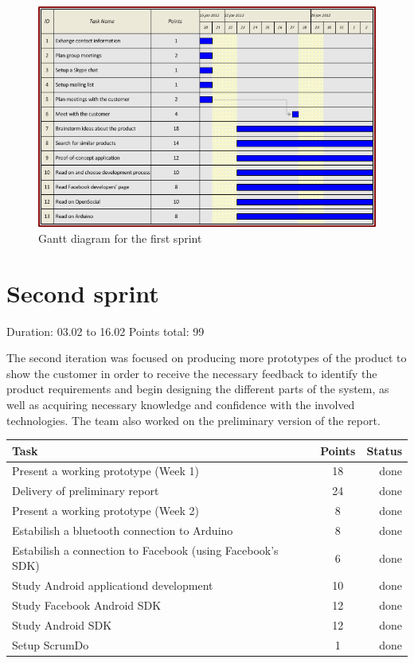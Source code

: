 \begin{figure}[h!]
\centering \includegraphics[scale=0.8]{img/sprints-gantt1.png}
\caption{Gantt diagram for the first sprint}
\label{fig:sprints-gantt1}
\end{figure}

\newpage


\section{Second sprint}

Duration: 03.02 to 16.02
Points total: 99

The second iteration was focused on producing more prototypes of the product to
show the customer in order to receive the necessary feedback to identify
the product requirements and begin designing the different parts of the system,
as well as acquiring necessary knowledge and confidence with the involved
technologies. The team also worked on the preliminary version of the report.

\begin{table}[ht!]
\begin{tabular}{ | l | c | r | }

\hline
\textbf{Task} & \textbf{Points} & \textbf{Status} \\
\hline

Present a working prototype	(Week 1)	& 18 & done \\
\hline
Delivery of preliminary report			& 24 & done \\
\hline
Present a working prototype	(Week 2)	& 8  & done \\
\hline
Estabilish a bluetooth connection to Arduino	& 8  & done \\
\hline
Estabilish a connection to Facebook
(using Facebook's SDK)				& 6  & done \\
\hline
Study Android applicationd development		& 10 & done \\
\hline
Study Facebook Android SDK			& 12 & done \\
\hline
Study Android SDK				& 12 & done \\
\hline
Setup ScrumDo					& 1  & done \\
\hline

\end{tabular}
\end{table}

